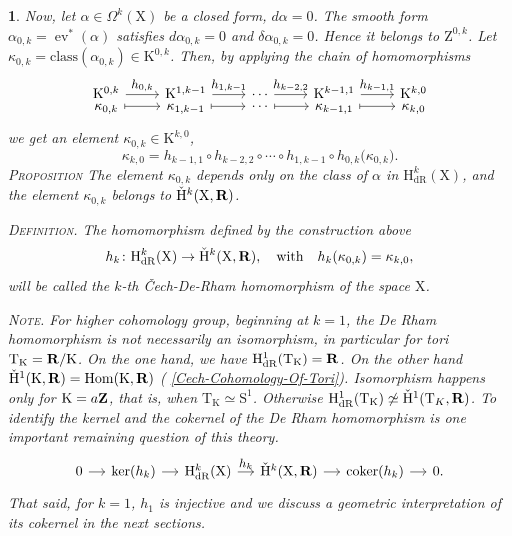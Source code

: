 \documentclass[12pt,reqno]{amsart}
\theoremstyle{article}
\newtheorem{article}{}
\newcommand{\art}[1]{(\text{\textsection} \ref{#1})}
\def \H{\mathrm H}
\def \K{\mathrm K}
\def \S{\mathrm S}
\def \T{\mathrm T}
\def \X{\mathrm X}
\def \Z{\mathrm Z}
\newcommand{\RR}{{\bf R}}
\newcommand{\ZZ}{{\bf Z}}
\newcommand{\class}{\mathrm{class}}
\DeclareMathOperator{\coker}{coker}
\newcommand{\dR}{\mathrm{dR}}
\DeclareMathOperator{\ev}{ev}
\DeclareMathOperator{\Hom}{Hom}
\newcommand{\vH}{\check{\mathrm{H}}}
\def \H{\mathrm H}
\begin{document}
\begin{article}
    Now,
    let $\alpha \in \Omega^k(\X)$ be a closed form,
    $d\alpha = 0$.
    The smooth form $\alpha_{0,k} = \ev^*(\alpha)$ satisfies $d\alpha_{0,k}=0$ and $\delta \alpha_{0,k}=0$.
    Hence it belongs to $\Z^{0,k}$.
    Let $\kappa_{0,k} = \class(\alpha_{0,k}) \in \K^{0,k}$.
    Then,
    by applying the chain of homomorphisms
    $$
    \begin{tikzcd}[column sep=normal,every label/.append style = {font = \small}]
      \K^{0,k} \arrow[r, "h_{0,k}"]  & \K^{1,k-1} \arrow[r, "h_{1,k-1}"] & \cdots \arrow[r, "h_{k-2,2}"] & \K^{k-1,1} \arrow[r, "h_{k-1,1}"]  & \K^{k,0} \\[-.75cm]
      \kappa_{0,k} \arrow[r,mapsto]  & \kappa_{1,k-1} \arrow[r,mapsto] & \cdots \arrow[r,mapsto] & \kappa_{k-1,1} \arrow[r,mapsto] & \kappa_{k,0}
    \end{tikzcd}
    $$
    we get an element $\kappa_{0,k} \in \K^{k,0}$,
    $$
    \kappa_{k,0} = h_{k-1,1} \circ h_{k-2,2} \circ \cdots \circ h_{1,k-1} \circ h_{0,k} \big(\kappa_{0,k}\big).
    $$
    \textsc{Proposition} {\it The element $\kappa_{0,k}$ depends only on the class of $\alpha$ in $\H_\dR^k(\X)$,
    and the element $\kappa_{0,k}$ belongs to $\vH^k(\X,\RR)$.}
    
    \textsc{Definition.} {\it The homomorphism defined by the construction above
    $$
    h_k \colon \H_\dR^k(\X) \to \vH^k(\X,\RR),
    \quad \text{with} \quad
    h_k(\kappa_{0,k}) = \kappa_{k,0},
    $$
    will be called the \emph{$k$-th \v{C}ech-De-Rham homomorphism} of the space $\X$.}
    
    \textsc{Note.} For higher cohomology group,
    beginning at $k=1$,
    the De Rham homomorphism is not necessarily an isomorphism,
    in particular for tori $\T_\K = \RR/\K$.
    On the one hand,
    we have $\H^1_\dR(\T_\K) = \RR$.
    On the other hand $\vH^1(\K,\RR) = \Hom(\K,\RR)$ \art{Cech-Cohomology-Of-Tori}.
    Isomorphism happens only for $\K = a\ZZ$,
    that is,
    when $\T_\K \simeq \S^1$.
    Otherwise $\H^1_\dR(\T_\K) \not\simeq \vH^1(\T_K,\RR)$.
    To identify the kernel and the cokernel of the De Rham homomorphism is one important remaining question of this theory.
    $$
    \begin{tikzcd}[column sep=small,every label/.append style = {font = \small}]
      0 \arrow[r] & \ker(h_k) \arrow[r] & \H_\dR^k(\X) \arrow[r,"h_k"] & \vH^k(\X,\RR) \arrow[r] & \coker(h_k) \arrow[r] & 0.
    \end{tikzcd}
    $$
    That said,
    for $k=1$,
    $h_1$ is injective and we discuss a geometric interpretation of its cokernel in the next sections.
  \end{article}
  
\end{document}
